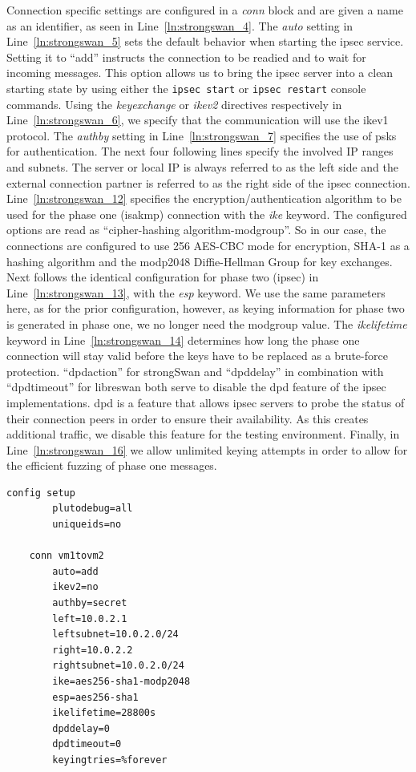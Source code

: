 Connection specific settings are configured in a \emph{conn} block and are given a name as an identifier, as seen in Line~\ref{ln:strongswan_4}. The \emph{auto} setting in Line~\ref{ln:strongswan_5} sets the default behavior when starting the \ac{ipsec} service. Setting it to ``add'' instructs the connection to be readied and to wait for incoming messages. This option allows us to bring the \ac{ipsec} server into a clean starting state by using either the \texttt{ipsec start} or \texttt{ipsec restart} console commands. Using the \emph{keyexchange} or 
\emph{ikev2} directives respectively in Line~\ref{ln:strongswan_6}, we specify that the communication will use the \ac{ike}v1 protocol. The \emph{authby} setting in Line~\ref{ln:strongswan_7} specifies the use of \acp{psk} for authentication. The next four following lines specify the involved IP ranges and subnets. The server or local IP is always referred to as the left side and the external connection partner is referred to as the right side of the \ac{ipsec} connection. Line~\ref{ln:strongswan_12} specifies the encryption/authentication algorithm to be used for the phase one (\ac{isakmp}) connection with the \emph{ike} keyword. The configured options are read as ``cipher-hashing algorithm-modgroup''. So in our case, the connections are configured to use \SI{256}{\bit} AES-CBC mode for encryption, SHA-1 as a hashing algorithm and the modp2048 Diffie-Hellman Group for key exchanges. Next follows the identical configuration for phase two (\ac{ipsec}) in Line~\ref{ln:strongswan_13}, with the \emph{esp} keyword. We use the same parameters here, as for the prior configuration, however, as keying information for phase two is generated in phase one, we no longer need the modgroup value. The \emph{ikelifetime} keyword in Line~\ref{ln:strongswan_14} determines how long the phase one connection will stay valid before the keys have to be replaced as a brute-force protection. ``dpdaction'' for strongSwan and ``dpddelay'' in combination with ``dpdtimeout'' for libreswan both serve to disable the \ac{dpd} feature of the \ac{ipsec} implementations. \ac{dpd} is a feature that allows \ac{ipsec} servers to probe the status of their connection peers in order to ensure their availability. As this creates additional traffic, we disable this feature for the testing environment. Finally, in Line~\ref{ln:strongswan_16} we allow unlimited keying attempts in order to allow for the efficient fuzzing of phase one messages.

\begin{lstlisting}[mathescape=true, float=ht, caption=libreswan configuration, label=lst:libreswan_config]
	config setup
		plutodebug=all
		uniqueids=no
	
	conn vm1tovm2
		auto=add
		ikev2=no
		authby=secret
		left=10.0.2.1 
		leftsubnet=10.0.2.0/24
		right=10.0.2.2
		rightsubnet=10.0.2.0/24
		ike=aes256-sha1-modp2048
		esp=aes256-sha1
		ikelifetime=28800s
		dpddelay=0
		dpdtimeout=0
		keyingtries=%forever
\end{lstlisting}

